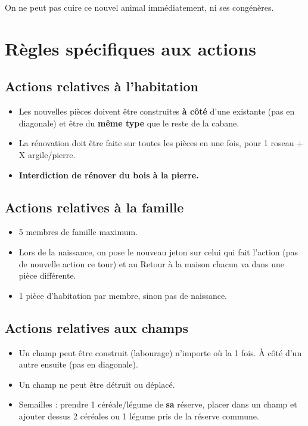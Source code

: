 \documentclass[10pt, a4paper]{article}	%
\begin{document}
\begin{multicols}{3}
On ne peut pas cuire ce nouvel animal immédiatement, ni ses congénères.





\section{Règles spécifiques aux actions}

\subsection{Actions relatives à l'habitation}

\begin{itemize}
\item Les nouvelles pièces doivent être construites \textbf{à côté} d'une existante (pas en diagonale) et être du \textbf{même type} que le reste de la cabane.
\item La rénovation doit être faite sur toutes les pièces en une fois, pour 1 roseau + X argile/pierre.
\item \textbf{Interdiction de rénover du bois à la pierre.}
\end{itemize}


\subsection{Actions relatives à la famille}
\begin{itemize}
\item 5 membres de famille maximum.
\item Lors de la naissance, on pose le nouveau jeton sur celui qui fait l'action (pas de nouvelle action ce tour) et au \og Retour à la maison\fg{} chacun va dans une pièce différente.
\item 1 pièce d'habitation par membre, sinon pas de naissance.
\end{itemize}


\subsection{Actions relatives aux champs}
\begin{itemize}
\item Un champ peut être construit (labourage) n'importe où la 1\iere{} fois. \`A côté d'un autre ensuite (pas en diagonale).
\item Un champ ne peut être détruit ou déplacé.
\item Semailles : prendre 1 céréale/légume de \textbf{sa} réserve, placer dans un champ et ajouter dessus 2 céréales ou 1 légume pris de la réserve commune.
\end{itemize}




\end{multicols}
\end{document}

